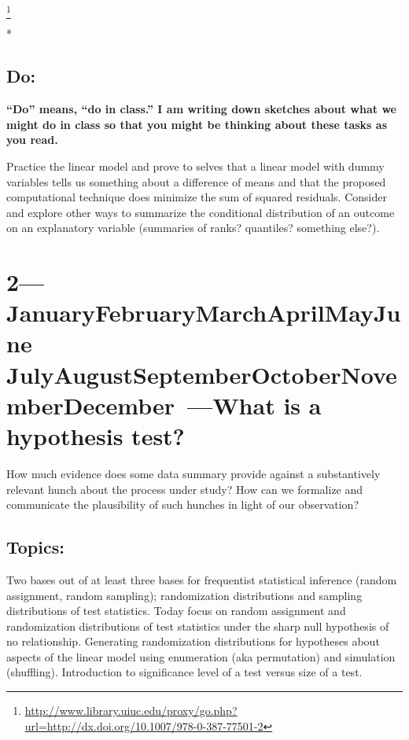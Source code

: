 \documentclass[10pt]{article}
\def\themonth{\ifcase\month\or
  January\or February\or March\or April\or May\or June\or
  July\or August\or September\or October\or November\or December\fi}
\begin{document}
\citealp[Chapters 1,2,5.1]{fox2008applied} %

\citealp[Pages
1--8]{berk2008statistical}\footnote{\url{http://www.library.uiuc.edu/proxy/go.php?url=http://dx.doi.org/10.1007/978-0-387-77501-2}}

*\citealp[Chapter 1--3]{berk04}


\subsection{Do:} \textbf{``Do'' means, ``do in class.'' I am writing
  down sketches about what we might do in class so that you might be
  thinking about these tasks as you read.}

Practice the linear model and prove to selves that a linear model with
dummy variables tells us something about a difference of means and
that the proposed computational technique does minimize the sum of
squared residuals. Consider and explore other ways to summarize the
conditional distribution of an outcome on an explanatory variable
(summaries of ranks? quantiles? something else?).

 

\AdvanceDate[7]
\section{2---\themonth~\the\day---What is a hypothesis test?} %

How much evidence does some data summary provide against a
substantively relevant hunch about the process under study? How can we
formalize and communicate the plausibility of such hunches in light of our observation?

\subsection{Topics:} Two bases out of at least three bases for
frequentist statistical inference (random assignment, random
sampling); randomization distributions and sampling distributions of
test statistics. Today focus on random assignment and randomization
distributions of test statistics under the sharp null hypothesis of no
relationship. Generating randomization distributions for hypotheses
about aspects of the linear model using enumeration (aka permutation)
and simulation (shuffling). Introduction to significance level of a
test versus size of a test.
\end{document}

